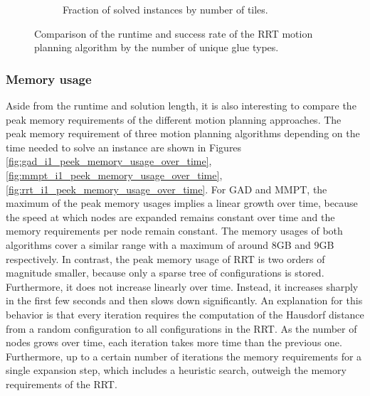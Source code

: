 \begin{figure}[htpb]
\begin{subfigure}[b]{0.48\textwidth}
\caption{Fraction of solved instances by number of tiles.}
\label{fig:rrt_i1_fraction_solved_over_glue_types}
\end{subfigure}
\caption[Runtime and success rate of RRT by number of glue types] {Comparison of the runtime and success rate of the RRT motion planning algorithm by the number of unique glue types.}
\label{fig:rrt_i1_glue_types}
\end{figure}

\vfill

\subsubsection{Memory usage}

Aside from the runtime and solution length, it is also interesting to compare the peak memory requirements of the different motion planning approaches.
The peak memory requirement of three motion planning algorithms depending on the time needed to solve an instance are shown in Figures \ref{fig:gad_i1_peek_memory_usage_over_time}, \ref{fig:mmpt_i1_peek_memory_usage_over_time}, \ref{fig:rrt_i1_peek_memory_usage_over_time}.
For GAD and MMPT, the maximum of the peak memory usages implies a linear growth over time, because the speed at which nodes are expanded remains constant over time and the memory requirements per node remain constant. The memory usages of both algorithms cover a similar range with a maximum of around $8$GB and $9$GB respectively.
In contrast, the peak memory usage of RRT is two orders of magnitude smaller, because only a sparse tree of configurations is stored. Furthermore, it does not increase linearly over time. Instead, it increases sharply in the first few seconds and then slows down significantly. An explanation for this behavior is that every iteration requires the computation of the Hausdorf distance from a random configuration to all configurations in the RRT. As the number of nodes grows over time, each iteration takes more time than the previous one. Furthermore, up to a certain number of iterations the memory requirements for a single expansion step, which includes a heuristic search, outweigh the memory requirements of the RRT.

